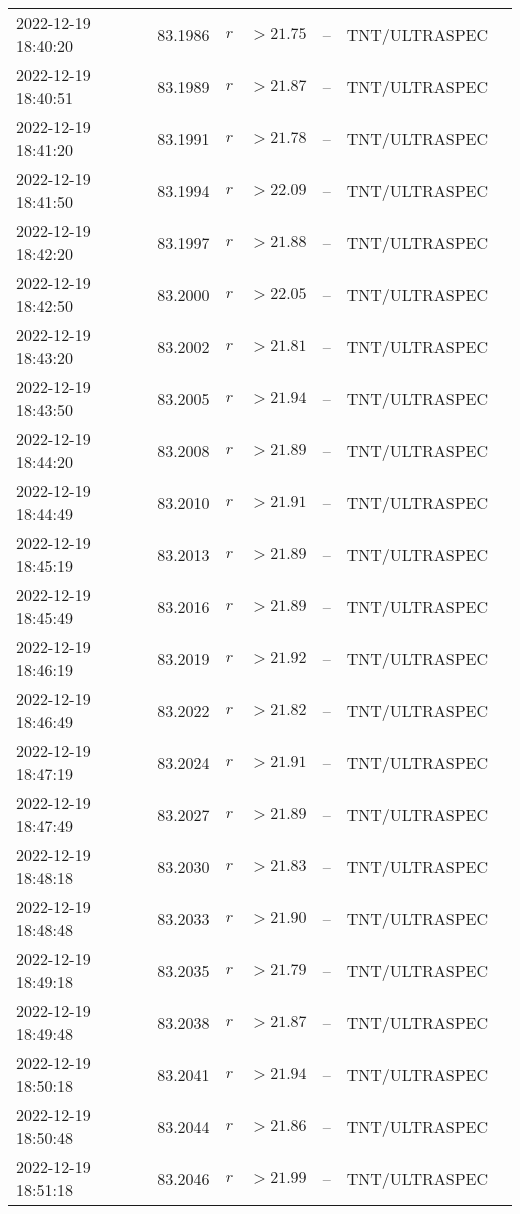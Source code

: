 \documentclass{nature_plusfigure}
\begin{document}
\begin{supplement}
\begin{center}
\begin{longtable}{lllllll}
2022-12-19 18:40:20 & 83.1986 & $r$ & $>21.75$ & -- & TNT/ULTRASPEC &  \\ 
2022-12-19 18:40:51 & 83.1989 & $r$ & $>21.87$ & -- & TNT/ULTRASPEC &  \\ 
2022-12-19 18:41:20 & 83.1991 & $r$ & $>21.78$ & -- & TNT/ULTRASPEC &  \\ 
2022-12-19 18:41:50 & 83.1994 & $r$ & $>22.09$ & -- & TNT/ULTRASPEC &  \\ 
2022-12-19 18:42:20 & 83.1997 & $r$ & $>21.88$ & -- & TNT/ULTRASPEC &  \\ 
2022-12-19 18:42:50 & 83.2000 & $r$ & $>22.05$ & -- & TNT/ULTRASPEC &  \\ 
2022-12-19 18:43:20 & 83.2002 & $r$ & $>21.81$ & -- & TNT/ULTRASPEC &  \\ 
2022-12-19 18:43:50 & 83.2005 & $r$ & $>21.94$ & -- & TNT/ULTRASPEC &  \\ 
2022-12-19 18:44:20 & 83.2008 & $r$ & $>21.89$ & -- & TNT/ULTRASPEC &  \\ 
2022-12-19 18:44:49 & 83.2010 & $r$ & $>21.91$ & -- & TNT/ULTRASPEC &  \\ 
2022-12-19 18:45:19 & 83.2013 & $r$ & $>21.89$ & -- & TNT/ULTRASPEC &  \\ 
2022-12-19 18:45:49 & 83.2016 & $r$ & $>21.89$ & -- & TNT/ULTRASPEC &  \\ 
2022-12-19 18:46:19 & 83.2019 & $r$ & $>21.92$ & -- & TNT/ULTRASPEC &  \\ 
2022-12-19 18:46:49 & 83.2022 & $r$ & $>21.82$ & -- & TNT/ULTRASPEC &  \\ 
2022-12-19 18:47:19 & 83.2024 & $r$ & $>21.91$ & -- & TNT/ULTRASPEC &  \\ 
2022-12-19 18:47:49 & 83.2027 & $r$ & $>21.89$ & -- & TNT/ULTRASPEC &  \\ 
2022-12-19 18:48:18 & 83.2030 & $r$ & $>21.83$ & -- & TNT/ULTRASPEC &  \\ 
2022-12-19 18:48:48 & 83.2033 & $r$ & $>21.90$ & -- & TNT/ULTRASPEC &  \\ 
2022-12-19 18:49:18 & 83.2035 & $r$ & $>21.79$ & -- & TNT/ULTRASPEC &  \\ 
2022-12-19 18:49:48 & 83.2038 & $r$ & $>21.87$ & -- & TNT/ULTRASPEC &  \\ 
2022-12-19 18:50:18 & 83.2041 & $r$ & $>21.94$ & -- & TNT/ULTRASPEC &  \\ 
2022-12-19 18:50:48 & 83.2044 & $r$ & $>21.86$ & -- & TNT/ULTRASPEC &  \\ 
2022-12-19 18:51:18 & 83.2046 & $r$ & $>21.99$ & -- & TNT/ULTRASPEC &  \\ 

\end{longtable}
\end{center}
\end{supplement}
\end{document}
